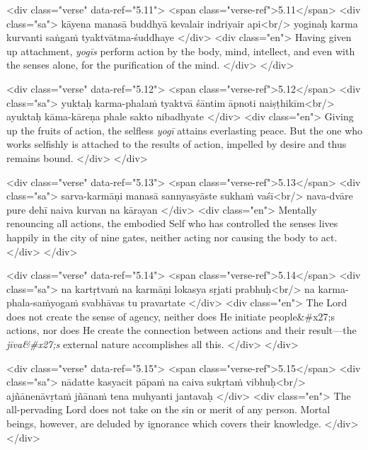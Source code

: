\begin{html}
<div class="verse" data-ref="5.11">
  <span class="verse-ref">5.11</span>
  <div class="sa">
    kāyena manasā buddhyā kevalair indriyair api<br/>
    yoginaḥ karma kurvanti saṅgaṁ tyaktvātma-śuddhaye
  </div>
  <div class="en">
    Having given up attachment, \textit{yogīs} perform action by the body, mind, intellect, and even with the senses alone, for the purification of the mind.
  </div>
</div>
\end{html}



\begin{html}
<div class="verse" data-ref="5.12">
  <span class="verse-ref">5.12</span>
  <div class="sa">
    yuktaḥ karma-phalaṁ tyaktvā śāntim āpnoti naiṣṭhikīm<br/>
    ayuktaḥ kāma-kāreṇa phale sakto nibadhyate
  </div>
  <div class="en">
    Giving up the fruits of action, the selfless \textit{yogī} attains everlasting peace. But the one who works selfishly is attached to the results of action, impelled by desire and thus remains bound.
  </div>
</div>
\end{html}



\begin{html}
<div class="verse" data-ref="5.13">
  <span class="verse-ref">5.13</span>
  <div class="sa">
    sarva-karmāṇi manasā sannyasyāste sukhaṁ vaśī<br/>
    nava-dvāre pure dehī naiva kurvan na kārayan
  </div>
  <div class="en">
    Mentally renouncing all actions, the embodied Self who has controlled the senses lives happily in the city of nine gates, neither acting nor causing the body to act.
  </div>
</div>
\end{html}



\begin{html}
<div class="verse" data-ref="5.14">
  <span class="verse-ref">5.14</span>
  <div class="sa">
    na kartṛtvaṁ na karmāṇi lokasya sṛjati prabhuḥ<br/>
    na karma-phala-saṁyogaṁ svabhāvas tu pravartate
  </div>
  <div class="en">
    The Lord does not create the sense of agency, neither does He initiate people&#x27;s actions, nor does He create the connection between actions and their result---the \textit{jīva&#x27;s} external nature accomplishes all this.
  </div>
</div>
\end{html}



\begin{html}
<div class="verse" data-ref="5.15">
  <span class="verse-ref">5.15</span>
  <div class="sa">
    nādatte kasyacit pāpaṁ na caiva sukṛtaṁ vibhuḥ<br/>
    ajñānenāvṛtaṁ jñānaṁ tena muhyanti jantavaḥ
  </div>
  <div class="en">
    The all-pervading Lord does not take on the sin or merit of any person. Mortal beings, however, are deluded by ignorance which covers their knowledge.
  </div>
</div>
\end{html}



